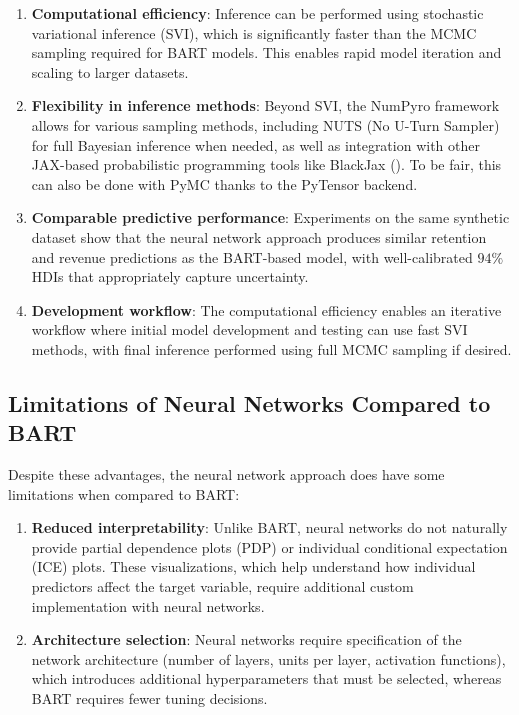 \documentclass[11pt]{amsart}
\theoremstyle{definition}
\begin{document}
\begin{enumerate}
    \item \textbf{Computational efficiency}: Inference can be performed using stochastic variational inference (SVI), which
          is significantly faster than the MCMC sampling required for BART models. This enables rapid model iteration and
          scaling to larger datasets.

    \item \textbf{Flexibility in inference methods}: Beyond SVI, the NumPyro framework allows for various sampling methods,
          including NUTS (No U-Turn Sampler) for full Bayesian inference when needed, as well as integration with other
          JAX-based probabilistic programming tools like BlackJax (\cite{cabezas2024blackjax}). To be fair, this can
          also be done with PyMC thanks to the PyTensor backend.

    \item \textbf{Comparable predictive performance}: Experiments on the same synthetic dataset show that the neural network
          approach produces similar retention and revenue predictions as the BART-based model, with well-calibrated $94\%$ HDIs
          that appropriately capture uncertainty.

    \item \textbf{Development workflow}: The computational efficiency enables an iterative workflow where initial model
          development and testing can use fast SVI methods, with final inference performed using full MCMC sampling if desired.
\end{enumerate}

\subsection{Limitations of Neural Networks Compared to BART}

Despite these advantages, the neural network approach does have some limitations when compared to BART:

\begin{enumerate}
    \item \textbf{Reduced interpretability}: Unlike BART, neural networks do not naturally provide partial dependence plots
          (PDP) or individual conditional expectation (ICE) plots. These visualizations, which help understand how individual
          predictors affect the target variable, require additional custom implementation with neural networks.

    \item \textbf{Architecture selection}: Neural networks require specification of the network architecture (number of
          layers, units per layer, activation functions), which introduces additional hyperparameters that must be selected,
          whereas BART requires fewer tuning decisions.
\end{enumerate}
\end{document}

